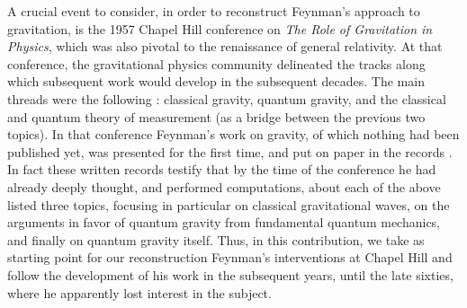 \documentclass{ws-procs961x669}            %
\begin{document}
A crucial event to consider, in order to reconstruct Feynman's
approach to gravitation, is the 1957 Chapel Hill conference
\cite{ChapelHill} on \emph{The Role of Gravitation in Physics},
which was also pivotal to the renaissance of general relativity.
At that conference, the gravitational physics community delineated
the tracks along which subsequent work would develop in the
subsequent decades. The main threads were the following
\cite{BergmannRMP}: classical gravity, quantum gravity, and the
classical and quantum theory of measurement (as a bridge between
the previous two topics). In that conference Feynman's work on
gravity, of which nothing had been published yet, was presented
for the first time, and put on paper in the records
\cite{ChapelHill}. In fact these written records testify that by
the time of the conference he had already deeply thought, and
performed computations, about each of the above listed three
topics, focusing in particular on classical gravitational waves,
on the arguments in favor of quantum gravity from fundamental
quantum mechanics, and finally on quantum gravity itself. Thus, in
this contribution, we take as starting point for our
reconstruction Feynman's interventions at Chapel Hill and follow
the development of his work in the subsequent years, until the
late sixties, where he apparently lost interest in the subject.
\end{document}
